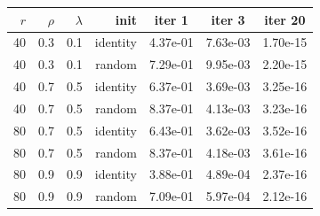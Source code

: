 \begin{tabular}{rrrrccc}
\toprule
$r$ & $\rho$ & $\lambda$ & init & iter 1 & iter 3 & iter 20 \\
\midrule
40 & 0.3 & 0.1 & identity & 4.37e-01 & 7.63e-03 & 1.70e-15 \\
40 & 0.3 & 0.1 & random & 7.29e-01 & 9.95e-03 & 2.20e-15 \\
40 & 0.7 & 0.5 & identity & 6.37e-01 & 3.69e-03 & 3.25e-16 \\
40 & 0.7 & 0.5 & random & 8.37e-01 & 4.13e-03 & 3.23e-16 \\
80 & 0.7 & 0.5 & identity & 6.43e-01 & 3.62e-03 & 3.52e-16 \\
80 & 0.7 & 0.5 & random & 8.37e-01 & 4.18e-03 & 3.61e-16 \\
80 & 0.9 & 0.9 & identity & 3.88e-01 & 4.89e-04 & 2.37e-16 \\
80 & 0.9 & 0.9 & random & 7.09e-01 & 5.97e-04 & 2.12e-16 \\
\bottomrule
\end{tabular}

